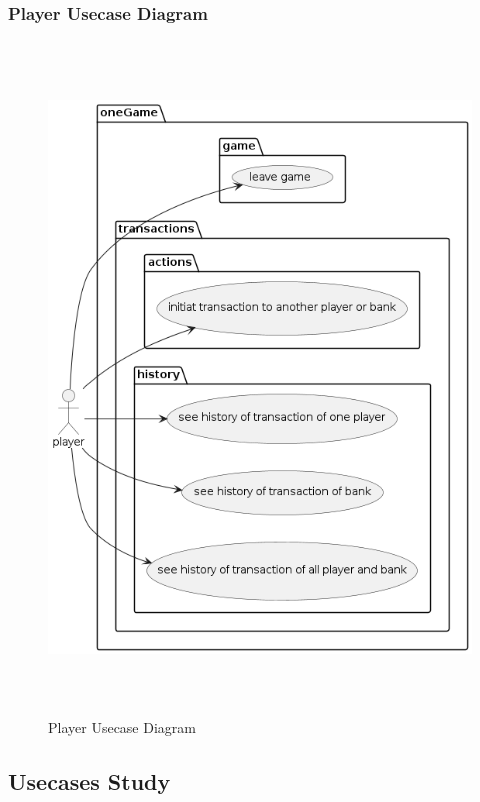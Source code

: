 \documentclass{article}
\begin{document}
\subsubsection{Player Usecase Diagram}
 \begin{figure}[H]
	 \centering
	 \includegraphics[height=7in]{../thesis_tex/assets/diagrams/player_ucd.png}
	 \caption{Player Usecase Diagram}
\end{figure}
\cleardoublepage

\subsection{Usecases Study}
\end{document}
